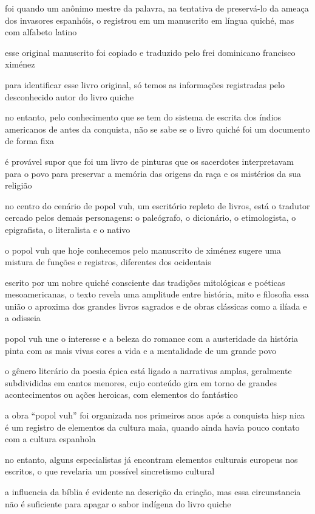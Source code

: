 foi quando um anônimo mestre da palavra, na tentativa de preservá-lo da ameaça dos invasores espanhóis, o registrou em um manuscrito em língua quiché, mas com alfabeto latino

esse original  manuscrito foi copiado e traduzido pelo frei dominicano francisco ximénez

para identificar esse livro original, só temos as informações registradas pelo desconhecido autor do livro quiche 

no entanto, pelo conhecimento que se tem do sistema de escrita dos índios americanos de antes da conquista, não se sabe se o livro quiché foi um documento de forma fixa 

é provável supor que foi um livro de pinturas que os sacerdotes interpretavam para o povo para preservar a memória das origens da raça e os mistérios da sua religião

no centro do cenário de popol vuh, um escritório repleto de livros, está o tradutor  cercado pelos demais personagens: o paleógrafo, o dicionário, o etimologista, o epigrafista, o literalista e o nativo


o popol vuh que hoje conhecemos pelo manuscrito de ximénez sugere uma mistura de funções e registros, diferentes dos ocidentais

escrito por um nobre quiché consciente das tradições mitológicas e poéticas mesoamericanas, o texto revela uma amplitude entre história, mito e filosofia essa união o aproxima dos grandes livros sagrados e de obras clássicas como a ilíada e a odisseia

popol vuh une o interesse e a beleza do romance com a austeridade da história pinta com as mais vivas cores a vida e a mentalidade de um grande povo


o gênero literário da poesia épica está ligado a narrativas amplas, geralmente subdivididas em cantos menores, cujo conteúdo gira em torno de grandes acontecimentos ou ações heroicas, com elementos do fantástico

a obra “popol vuh” foi organizada nos primeiros anos após a conquista hisp nica é um registro de elementos da cultura maia, quando ainda havia pouco contato com a cultura espanhola 

no entanto, alguns especialistas já encontram elementos culturais europeus nos escritos, o que revelaria um possível sincretismo cultural

a influencia da bíblia é evidente na descrição da criação, mas essa circunstancia não é suficiente para apagar o sabor indígena do livro quiche 


